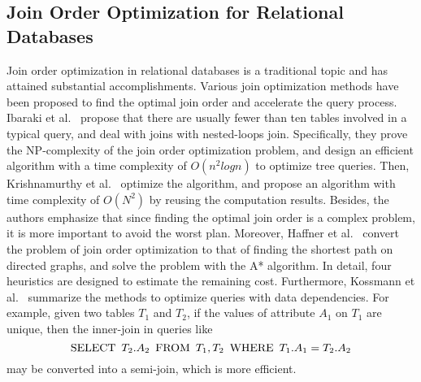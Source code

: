 \subsection{Join Order Optimization for Relational Databases}
\label{sec:related-work:ropt}
Join order optimization in relational databases is a traditional topic and has attained substantial accomplishments.
Various join optimization methods have been proposed to find the optimal join order and accelerate the query process.
Ibaraki et al.~\cite{nested-tods-1984} propose that there are usually fewer than ten tables involved in a typical query, and deal with joins with nested-loops join.
Specifically, they prove the NP-complexity of the join order optimization problem, and design an efficient algorithm with a time complexity of $O(n^2logn)$ to optimize tree queries.
Then, Krishnamurthy et al.~\cite{optimize-nested-vldb-1986} optimize the algorithm, and propose an algorithm with time complexity of $O(N^2)$ by reusing the computation results.
Besides, the authors emphasize that since finding the optimal join order is a complex problem, it is more important to avoid the worst plan.
Moreover, Haffner et al.~\cite{astarjoin} convert the problem of join order optimization to that of finding the shortest path on directed graphs, and solve the problem with the A* algorithm.
In detail, four heuristics are designed to estimate the remaining cost.
Furthermore, Kossmann et al.~\cite{data-dependency-join} summarize the methods to optimize queries with data dependencies.
For example, given two tables $T_1$ and $T_2$, if the values of attribute $A_1$ on $T_1$ are unique, then the inner-join in queries like 
\begin{equation*}
    \text{SELECT}\hspace{.5em} T_2.A_2 \hspace{.5em}\text{FROM}\hspace{.5em} T_1, T_2 \hspace{.5em}\text{WHERE}\hspace{.5em} T_1.A_1 = T_2.A_2
\end{equation*}
may be converted into a semi-join, which is more efficient.


